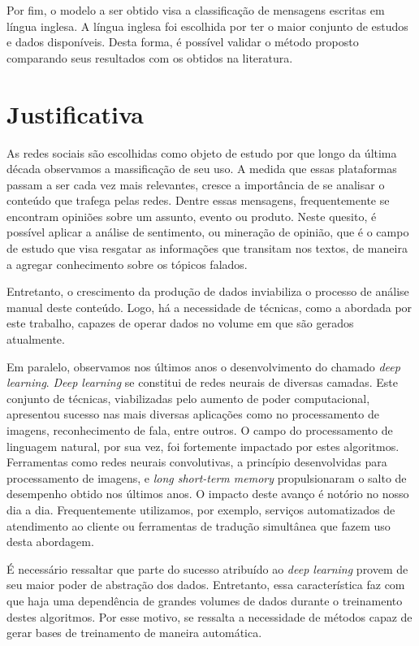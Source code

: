 Por fim, o modelo a ser obtido visa a classificação de mensagens escritas em língua inglesa.
A língua inglesa foi escolhida por ter o maior conjunto de estudos e dados disponíveis.
Desta forma, é possível validar o método proposto comparando seus resultados com os obtidos na literatura.

\section{Justificativa}

As redes sociais são escolhidas como objeto de estudo por que longo da última década observamos a massificação de seu
uso.
A medida que essas plataformas passam a ser cada vez mais relevantes, cresce a importância de se analisar o conteúdo
que trafega pelas redes.
Dentre essas mensagens, frequentemente se encontram opiniões sobre um assunto, evento ou produto.
Neste quesito, é possível aplicar a análise de sentimento, ou mineração de opinião, que é o campo de estudo que visa
resgatar as informações que transitam nos textos, de maneira a agregar conhecimento sobre os tópicos falados.

Entretanto, o crescimento da produção de dados inviabiliza o processo de análise manual deste conteúdo.
Logo, há a necessidade de técnicas, como a abordada por este trabalho, capazes de operar dados no volume em que são
gerados atualmente.

Em paralelo, observamos nos últimos anos o desenvolvimento do chamado \textit{deep learning}.
\textit{Deep learning} se constitui de redes neurais de diversas camadas.
Este conjunto de técnicas, viabilizadas pelo aumento de poder computacional, apresentou sucesso nas mais diversas
aplicações como no processamento de imagens, reconhecimento de fala, entre outros.
O campo do processamento de linguagem natural, por sua vez, foi fortemente impactado por estes algoritmos.
Ferramentas como redes neurais convolutivas, a princípio desenvolvidas para processamento de imagens, e
\textit{long short-term memory} propulsionaram o salto de desempenho obtido nos últimos anos.
O impacto deste avanço é notório no nosso dia a dia.
Frequentemente utilizamos, por exemplo, serviços automatizados de atendimento ao cliente ou ferramentas de tradução
simultânea que fazem uso desta abordagem.

É necessário ressaltar que parte do sucesso atribuído ao \textit{deep learning} provem de seu maior poder de abstração
dos dados.
Entretanto, essa característica faz com que haja uma dependência de grandes volumes de dados durante o treinamento
destes algoritmos.
Por esse motivo, se ressalta a necessidade de métodos capaz de gerar bases de treinamento de maneira automática.

